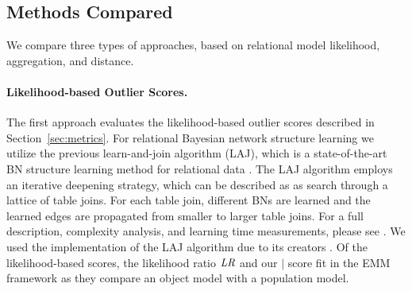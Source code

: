 {\begin{table}
					\end{table}
					
					
					\subsection{Methods Compared}
					\label{sec:methods}
					We compare three types of approaches, based on relational model likelihood, aggregation, and distance. 
					
\paragraph{Likelihood-based Outlier Scores.} The first approach evaluates the likelihood-based outlier scores described in Section~\ref{sec:metrics}. For relational Bayesian network structure learning we utilize the previous learn-and-join algorithm (LAJ), which is
					a state-of-the-art BN structure learning method for relational data \citep{Schulte2012}. The LAJ algorithm employs an iterative deepening strategy, which can be described as as search through a lattice of table joins. For each table join, different BNs are learned and the learned edges are propagated from smaller to larger table joins. 	For a full description, complexity analysis, and learning time measurements, please see \citep{Schulte2012}. 	We used the implementation of the LAJ algorithm due to its creators \citep{bib:jbnsite}. Of the likelihood-based scores, the likelihood ratio $\it{LR}$ and our $\mid$ score fit in the EMM framework as they compare an object model with a population model. 
					
}
